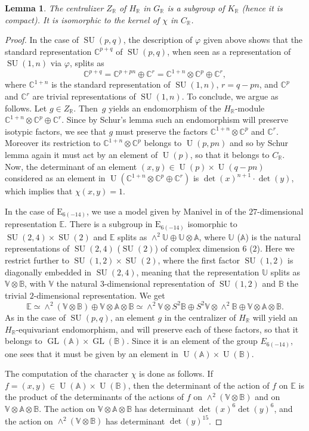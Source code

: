 \documentclass[JEP,XML,SOM,Unicode,NoFloatCountersInSection]{cedram}
\newcommand{\citestar}[3]{\cite[#3]{#1}}
\theoremstyle{plain}
\newtheorem{lemm}[theo]{Lemma}
\theoremstyle{definition}
\DeclareMathOperator{\GL}{GL}
\DeclareMathOperator{\SU}{SU}
\DeclareMathOperator{\rU}{U}
\newcommand{\bA}{\mathbb{A}}
\newcommand{\bB}{\mathbb{B}}
\newcommand{\bC}{\mathbb{C}}
\newcommand{\bE}{\mathbb{E}}
\newcommand{\bU}{\mathbb{U}}
\newcommand{\bV}{\mathbb{V}}
\newcommand{\bR}{\mathbb{R}}
\begin{document}
\begin{lemm}
\label{lemm:Z}
The centralizer $Z_\bR$ of $H_\bR$ in $G_\bR$ is a subgroup of $K_\bR$ (hence it is compact). It is
isomorphic to the kernel of $\chi$ in $C_\bR$.
\end{lemm}
\begin{proof}
In the case of $\SU(p,q)$, the description of $\varphi$ given above shows that the standard
representation $\bC^{p+q}$ of $\SU(p,q)$, when seen as a representation of $\SU(1,n)$ via
$\varphi$, splits as
$$
\bC^{p+q}=\bC^{p+pn}\oplus\bC^r=\bC^{1+n}\otimes\bC^p\oplus\bC^r,
$$
where $\bC^{1+n}$ is the standard representation of $\SU(1,n)$, $r=q-pn$, and
$\bC^p$ and $\bC^r$ are trivial representations of $\SU(1,n)$.
To conclude, we argue as follows. Let \hbox{$g \in Z_\bR$}. Then~$g$ yields an endomorphism
of the $H_\bR$-module $\bC^{1+n}\otimes\bC^p\oplus\bC^r$. Since by Schur's lemma
such an endomorphism will
preserve isotypic factors, we see that
$g$ must preserve the factors $\bC^{1+n}\otimes\bC^p$ and $\bC^r$. Moreover its
restriction to $\bC^{1+n}\otimes\bC^p$ belongs to
$\rU(p,pn)$ and so by Schur lemma again
it must act by an element of $\rU(p)$, so that it belongs to $C_\bR$. Now, the determinant of an element
$(x,y) \in \rU(p) \times \rU(q-pn)$ considered as an element in $\rU(\bC^{1+n}\otimes\bC^p\oplus\bC^r)$ is
$\det(x)^{n+1} \cdot \det(y)$, which implies that $\chi(x,y)=1$.

In the case of $\mathrm{E}_{6(-14)}$, we use a model given
by Manivel in \citestar{manivel}*{Ex.\,3 p.\,464} of the $27$-dimensional representation $\bE$.
There is a subgroup in $\mathrm{E}_{6(-14)}$ isomorphic to $\SU(2,4) \times \SU(2)$ and $\bE$ splits as
$\wedge^2 \bU \oplus \bU \otimes \bA$, where
$\bU$ (\resp $\bA$) is the natural representations of $\SU(2,4)$ (\resp $\SU(2)$) of complex dimension $6$ (\resp $2$).
Here we restrict further to $\SU(1,2) \times \SU(2)$, where the first factor $\SU(1,2)$ is
diagonally embedded in $\SU(2,4)$, meaning that the representation
$\bU$ splits as $\bV \otimes \bB$, with $\bV$ the natural $3$-dimensional representation of
$\SU(1,2)$ and $\bB$
the trivial $2$-dimensional representation. We get
$$
\bE \simeq \wedge^2(\bV \otimes \bB) \oplus \bV \otimes \bA \otimes \bB
\simeq \wedge^2 \bV \otimes S^2 \bB \oplus S^2 \bV \otimes \wedge^2 \bB \oplus \bV \otimes \bA \otimes \bB.
$$
As in the case of $\SU(p,q)$, an element $g$ in the centralizer of $H_\bR$ will yield an
$H_\bR$\nobreakdash-equivariant endomorphism, and will preserve each of these factors, so that it belongs to
$\GL(\bA) \times \GL(\bB)$.
Since it is an element of the group $E_{6(-14)}$, one sees that it must be given by an
element in $\rU(\bA) \times \rU(\bB)$.

The computation of the character $\chi$ is done as follows. If $f=(x,y) \in \rU(\bA) \times \rU(\bB)$,
then the determinant of the action of $f$ on
$\bE$ is the product of the determinants of the actions of $f$ on $\wedge^2(\bV \otimes \bB)$ and on
$\bV \otimes \bA \otimes \bB$.
The action on $\bV \otimes \bA \otimes \bB$ has determinant $\det(x)^6\det(y)^6$, and the action on
$\wedge^2(\bV \otimes \bB)$
has determinant $\det(y)^{15}$.
\end{proof}
\end{document}
